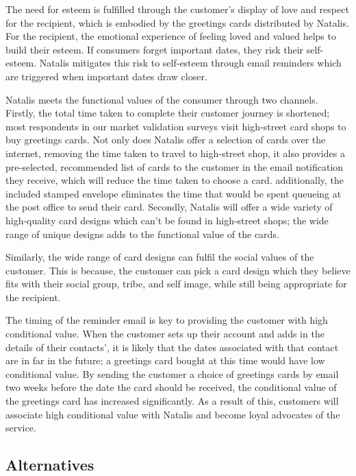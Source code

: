 \documentclass[10pt,a4paper]{article}
\begin{document}
The need for esteem is fulfilled through the customer's display of love and respect for the recipient, which is embodied by the greetings cards distributed by Natalis. For the recipient, the emotional experience of feeling loved and valued helps to build their esteem. If consumers forget important dates, they risk their self-esteem. Natalis mitigates this risk to self-esteem through email reminders which are triggered when important dates draw closer.

Natalis meets the functional values of the consumer through two channels. Firstly, the total time taken to complete their customer journey is shortened; most respondents in our market validation surveys visit high-street card shops to buy greetings cards. Not only does Natalis offer a selection of cards over the internet, removing the time taken to travel to high-street shop, it also provides a pre-selected, recommended list of cards to the customer in the email notification they receive, which will reduce the time taken to choose a card. additionally, the included stamped envelope eliminates the time that would be spent queueing at the post office to send their card. Secondly, Natalis will offer a wide variety of high-quality card designs which can't be found in high-street shops; the wide range of unique designs adds to the functional value of the cards.

Similarly, the wide range of card designs can fulfil the social values of the customer. This is because, the customer can pick a card design which they believe fits with their social group, tribe, and self image, while still being appropriate for the recipient.

The timing of the reminder email is key to providing the customer with high conditional value. When the customer sets up their account and adds in the details of their contacts', it is likely that the dates associated with that contact are in far in the future; a greetings card bought at this time would have low conditional value. By sending the customer a choice of greetings cards by email two weeks before the date the card should be received, the conditional value of the greetings card has increased significantly. As a result of this, customers will associate high conditional value with Natalis and become loyal advocates of the service.


\subsection*{Alternatives}
\end{document}
